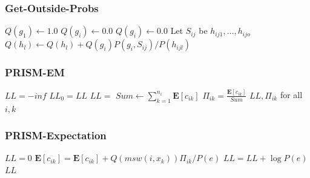 \documentclass[trans,aspectratio=1610]{beamer}
\newcommand{\defpprog}{\ensuremath{\mathcal{P}}\xspace}
\begin{document}
\begin{frame}
  \frametitle{Get-Outside-Probs}
\begin{algorithmic}[1]
\State   $Q(g_1)\gets 1.0$
  \State   $Q(g_i)\gets 0.0$
\EndFor
{}
  \State   $Q(g_i)\gets 0.0$
    \State Let $S_{ij}$ be $h_{ij1},\ldots,h_{ijo}$
      \State $Q(h_l)\gets Q(h_l)+Q(g_i)P(g_i,S_{ij})/P(h_{ijl})$
    \EndFor
  \EndFor
\EndFor
\EndProcedure
\end{algorithmic}
\end{frame}


\begin{frame}
  \frametitle{PRISM-EM}
\begin{algorithmic}[1]
\Function{PRISM-EM}{$E,\defpprog,\epsilon$}
\State $LL=-\mathit{inf}$
\Repeat
  \State $LL_0=LL$
  \State $LL=$ 
    \State $Sum\gets\sum_{k=1}^{n_i}\mathbf{E}[c_{ik}]$
      \State $\Pi_{ik}=\frac{\mathbf{E}[c_{ik}]}{Sum}$
    \EndFor
  \EndFor
{}
\State\Return  $LL,\Pi_{ik}$ for all $i,k$
\EndFunction
\end{algorithmic}
\end{frame}

\begin{frame}
  \frametitle{PRISM-Expectation}
\begin{algorithmic}[1]
\State $LL=0$
  \State {}
  \State {}
      \State $\mathbf{E}[c_{ik}]=\mathbf{E}[c_{ik}]+Q(msw(i,x_k))\Pi_{ik}/P(e)$
    \EndFor
  \EndFor
  \State $LL=LL+\log P(e)$
\EndFor
\State \Return $LL$
\EndFunction
\end{algorithmic}
\end{frame}
\end{document}
